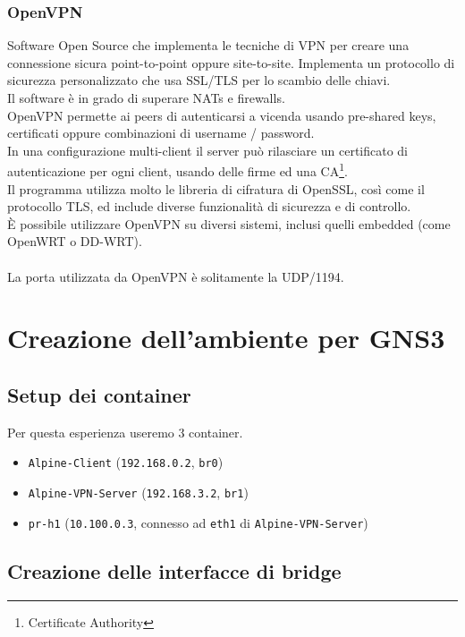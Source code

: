 \documentclass{article}
\newcommand{\interface}[1]{{\lstinline[basicstyle=\ttfamily\color{brown}]|#1|}}
\newcommand{\ipaddress}[1]{{\lstinline[basicstyle=\ttfamily\color{purple}]|#1|}}
\newcommand{\hostname}[1]{{\lstinline[basicstyle=\ttfamily\color{teal}]|#1|}}
\begin{document}
\subsubsection{OpenVPN}
Software Open Source che implementa le tecniche di VPN per creare una connessione sicura point-to-point oppure site-to-site.
Implementa un protocollo di sicurezza personalizzato che usa SSL/TLS per lo scambio delle chiavi. \\
Il software è in grado di superare NATs e firewalls.\\
OpenVPN permette ai peers di autenticarsi a vicenda usando pre-shared keys, certificati oppure combinazioni di username / password. \\
In una configurazione multi-client il server può rilasciare un certificato di autenticazione per ogni client, usando delle firme ed una CA\footnote{Certificate Authority}.\\
Il programma utilizza molto le libreria di cifratura di OpenSSL, così come il protocollo TLS, ed include diverse funzionalità di sicurezza e di controllo.\\
È possibile utilizzare OpenVPN su diversi sistemi, inclusi quelli embedded (come OpenWRT o DD-WRT).\\
\\
La porta utilizzata da OpenVPN è solitamente la UDP/1194.

\pagebreak
\section{Creazione dell'ambiente per GNS3}

\subsection{Setup dei container}
Per questa esperienza useremo 3 container.
\begin{itemize}
    \item \hostname{Alpine-Client} (\ipaddress{192.168.0.2}, \interface{br0})
    \item \hostname{Alpine-VPN-Server} (\ipaddress{192.168.3.2}, \interface{br1})
    \item \hostname{pr-h1} (\ipaddress{10.100.0.3}, connesso ad \interface{eth1} di \hostname{Alpine-VPN-Server})
\end{itemize}

\subsection{Creazione delle interfacce di bridge}
\end{document}
